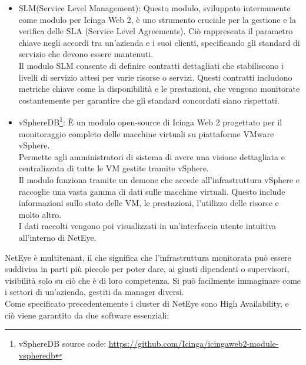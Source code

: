 \begin{itemize}
  \item SLM(Service Level Management): Questo modulo, sviluppato internamente
    come modulo per Icinga Web 2, è uno strumento cruciale per la gestione e la verifica
    delle SLA (Service Level Agreements). Ciò rappresenta il parametro chiave
    negli accordi tra un'azienda e i suoi clienti, specificando gli standard di servizio
    che devono essere mantenuti.\\ Il modulo SLM consente di definire contratti dettagliati
    che stabiliscono i livelli di servizio attesi per varie risorse o servizi.
    Questi contratti includono metriche chiave come la disponibilità e le
    prestazioni, che vengono monitorate costantemente per garantire che gli standard
    concordati siano rispettati.

  \item vSphereDB\footnote{vSphereDB source code: \url{https://github.com/Icinga/icingaweb2-module-vspheredb}}:
    È un modulo open-source di Icinga Web 2 progettato per il monitoraggio completo
    delle macchine virtuali su piattaforme VMware vSphere.\\ Permette agli amministratori
    di sistema di avere una visione dettagliata e centralizzata di tutte le VM gestite
    tramite vSphere.\\ Il modulo funziona tramite un demone che accede all'infrastruttura
    vSphere e raccoglie una vasta gamma di dati sulle macchine virtuali. Questo
    include informazioni sullo stato delle VM, le prestazioni, l'utilizzo delle
    risorse e molto altro.\\ I dati raccolti vengono poi visualizzati in un'interfaccia
    utente intuitiva all'interno di NetEye.
\end{itemize}
NetEye è multitenant, il che significa che l'infrastruttura monitorata può
essere suddivisa in parti più piccole per poter dare, ai giusti dipendenti o supervisori,
visibilità solo su ciò che è di loro competenza. Si può facilmente immaginare come
i settori di un'azienda, gestiti da manager diversi.\\ Come specificato
precedentemente i cluster di NetEye sono High Availability, e ciò viene garantito
da due software essenziali:

